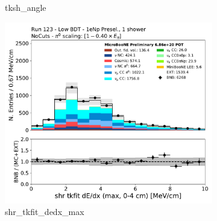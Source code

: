 \begin{figure}[H]
\begin{subfigure}{0.3\textwidth}
    \caption{tksh\_angle}
    \end{subfigure}
    \begin{subfigure}{0.3\textwidth}
    \includegraphics[width=1.0\textwidth]{Sidebands/Figures/1eNp/LPID_NPOneShr_None_pi0e40/shr_tkfit_dedx_max.pdf}
    \caption{shr\_tkfit\_dedx\_max}
    \end{subfigure}
    \caption{} 
    \label{fig:LPID_1eNp_1}
\end{figure}

